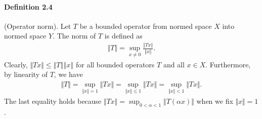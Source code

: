 \documentclass{article}
\begin{document}
\paragraph{Definition 2.4\label{def:2.4}} (Operator norm). Let $T$ be a bounded operator from normed space $X$ into normed space $Y$. The norm of $T$ is defined as
\begin{align*}
	\Vert T\Vert = \sup_{x\neq 0}\frac{\Vert Tx\Vert}{\Vert x\Vert}.
\end{align*}
Clearly, $\Vert Tx\Vert \leq \left\Vert T\right\Vert\left\Vert x\right\Vert$ for all bounded operators $T$ and all $x\in X$. Furthermore, by linearity of $T$, we have
\begin{align*}
	\Vert T\Vert = \sup_{\Vert x\Vert=1}\Vert Tx\Vert = \sup_{\Vert x\Vert\leq 1}\Vert Tx\Vert = \sup_{\Vert x\Vert < 1}\Vert Tx\Vert.
\end{align*}
The last equality holds because $\Vert Tx\Vert = \sup_{0<\alpha<1}\Vert T(\alpha x)\Vert$ when we fix $\Vert x\Vert =1$. 
\end{document}
